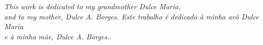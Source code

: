 


\begin{dedicatoria}

  \vspace*{\fill}
  \centering
  \noindent
  \textit{\lang
    {
      This work is dedicated to my grandmother Dulce Maria, \\
      and to my mother, Dulce A. Borges.
    }
    {
      Este trabalho é dedicado à minha avó Dulce Maria \\
      e à minha mãe, Dulce A. Borges..
    }
  }
  \vspace*{\fill}

\end{dedicatoria}


